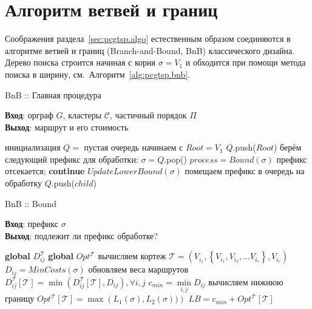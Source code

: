 
\section{Алгоритм ветвей и границ}
\label{sec:pcgtsp.bnb}

Соображения раздела~\ref{sec:pcgtsp.algo}
естественным образом соединяются
в алгоритме ветвей и границ
(Branch-and-Bound, BnB)
классического дизайна.
Дерево поиска строится начиная с корня
$\sigma=V_1$
и обходится при помощи метода поиска в ширину,
см.~Алгоритм~\ref{alg:pcgtsp.bnb}.

\begin{algorithm}
  \caption{BnB :: Главная процедура}\label{alg:pcgtsp.bnb}
  \textbf{Вход}: орграф $G$, кластеры $\mathcal C$, частичный порядок $\Pi$ \\
  \textbf{Выход}: маршрут и его стоимость
  \begin{algorithmic}[1]
      \STATE инициализация $Q =$ пустая очередь
      \STATE начинаем с $Root = V_1$
      \STATE $Q$.push($Root$)
          \STATE берём следующий префикс для обработки: $\sigma = Q$.pop()
          \STATE $process = Bound(\sigma)$ 
              \STATE префикс отсекается; \textbf{continue} 
          \ENDIF
          \STATE $UpdateLowerBound(\sigma)$ 
              \STATE помещаем префикс в очередь на обработку $Q$.push($child$)
          \ENDFOR
      \ENDWHILE
  \end{algorithmic}
\end{algorithm}

\begin{algorithm}
  \caption{BnB :: Bound}\label{alg:bnb:bound}
  \textbf{Вход}: префикс $\sigma$ \\
  \textbf{Выход}: подлежит ли префикс обработке?
  \begin{algorithmic}[1]
      \STATE \textbf{global} $D_{ij}^{\mathcal T}$
      \STATE \textbf{global} $Opt^{\mathcal T}$
      \STATE вычисляем кортеж $\mathcal T = \left(V_{i_1},
          \left\{V_{i_1}, V_{i_2}, \dots V_{i_r}\right\}, V_{i_r} \right)$
          \label{alg:bnb:bound:key}
      \STATE $D_{ij} = MinCosts(\sigma)$
          \label{alg:bnb:bound:pfx}
          \RETURN \FALSE
          \label{alg:bnb:cut:prefix}
      \ENDIF
      \STATE  обновляем веса маршрутов $D_{ij}^{\mathcal T}[\mathcal T]  = \min \left(
          D_{ij}^{\mathcal T}[\mathcal T], D_{ij} \right),
          \forall i, j$
      \STATE  $c_{min} = \min\limits_{i, j} D_{ij}$
          \STATE вычисляем нижнюю границу $Opt^{\mathcal T}[\mathcal T] = \max\left(L_1(\sigma), L_2(\sigma))\right)$
          \label{alg:bnb:bound:sfx}
      \ENDIF
      \STATE $LB = c_{min} + Opt^{\mathcal T}[\mathcal T]$
          \label{alg:bnb:bound:lb}
          \RETURN \FALSE
      \ENDIF
      \RETURN \TRUE
  \end{algorithmic}
\end{algorithm}

